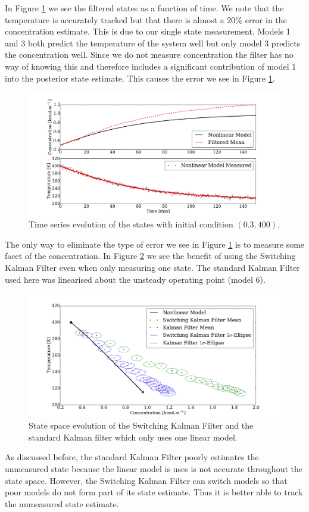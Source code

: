 \documentclass[../masters.tex]{subfiles}
\begin{document}
In Figure \ref{fig_7mod_t_m1} we see the filtered states as a function of time. We note that the temperature is accurately tracked but that there is almost a 20\% error in the concentration estimate. This is due to our single state measurement. Models 1 and 3 both predict the temperature of the system well but only model 3 predicts the concentration well. Since we do not measure concentration the filter has no way of knowing this and therefore includes a significant contribution of model 1 into the posterior state estimate. This causes the error we see in Figure \ref{fig_7mod_t_m1}.  
\begin{figure}[H] 
\centering
\includegraphics[scale=0.3]{skf_s7_t_m1.pdf}
\caption{Time series evolution of the states with initial condition $(0.3, 400)$.}
\label{fig_7mod_t_m1}
\end{figure}
The only way to eliminate the type  of error we see in Figure \ref{fig_7mod_t_m1} is to measure some facet of the concentration. In Figure \ref{fig_7mod_p_m1} we see the benefit of using the Switching Kalman Filter even when only measuring one state. The standard Kalman Filter used here was linearised about the unsteady operating point (model 6).
\begin{figure}[H] 
\centering
\includegraphics[scale=0.3]{skf_s7_p_m1.pdf}
\caption{State space evolution of the Switching Kalman Filter and the standard Kalman filter which only uses one linear model.}
\label{fig_7mod_p_m1}
\end{figure}
As discussed before, the standard Kalman Filter poorly estimates the unmeasured state because the linear model is uses is not accurate throughout the state space. However, the Switching Kalman Filter can switch models so that poor models do not form part of its state estimate. Thus it is better able to track the unmeasured state estimate.  
\end{document}
